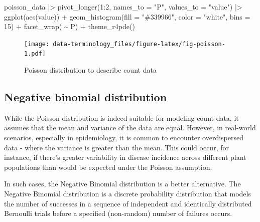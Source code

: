 \documentclass[
  letterpaper,
]{book}
\newenvironment{Shaded}{\begin{snugshade}}{\end{snugshade}}
\newcommand{\AttributeTok}[1]{\textcolor[rgb]{0.40,0.45,0.13}{#1}}
\newcommand{\DecValTok}[1]{\textcolor[rgb]{0.68,0.00,0.00}{#1}}
\newcommand{\FunctionTok}[1]{\textcolor[rgb]{0.28,0.35,0.67}{#1}}
\newcommand{\NormalTok}[1]{\textcolor[rgb]{0.00,0.23,0.31}{#1}}
\newcommand{\SpecialCharTok}[1]{\textcolor[rgb]{0.37,0.37,0.37}{#1}}
\newcommand{\StringTok}[1]{\textcolor[rgb]{0.13,0.47,0.30}{#1}}
\begin{document}
\begin{Shaded}
\begin{Highlighting}[]
\NormalTok{poisson\_data }\SpecialCharTok{|\textgreater{}}
  \FunctionTok{pivot\_longer}\NormalTok{(}\DecValTok{1}\SpecialCharTok{:}\DecValTok{2}\NormalTok{, }\AttributeTok{names\_to =} \StringTok{"P"}\NormalTok{,}
               \AttributeTok{values\_to =} \StringTok{"value"}\NormalTok{) }\SpecialCharTok{|\textgreater{}}
  \FunctionTok{ggplot}\NormalTok{(}\FunctionTok{aes}\NormalTok{(value)) }\SpecialCharTok{+}
  \FunctionTok{geom\_histogram}\NormalTok{(}\AttributeTok{fill =} \StringTok{"\#339966"}\NormalTok{,}
                 \AttributeTok{color =} \StringTok{"white"}\NormalTok{,}
                 \AttributeTok{bins =} \DecValTok{15}\NormalTok{) }\SpecialCharTok{+}
  \FunctionTok{facet\_wrap}\NormalTok{( }\SpecialCharTok{\textasciitilde{}}\NormalTok{ P) }\SpecialCharTok{+}
  \FunctionTok{theme\_r4pde}\NormalTok{()}
\end{Highlighting}
\end{Shaded}

\begin{figure}

{\centering \texttt{[image: data-terminology\_files/figure-latex/fig-poisson-1.pdf]}

}

\caption{\label{fig-poisson}Poisson distribution to describe count data}

\end{figure}

\hypertarget{negative-binomial-distribution}{%
\subsection{Negative binomial
distribution}\label{negative-binomial-distribution}}

While the Poisson distribution is indeed suitable for modeling count
data, it assumes that the mean and variance of the data are equal.
However, in real-world scenarios, especially in epidemiology, it is
common to encounter overdispersed data - where the variance is greater
than the mean. This could occur, for instance, if there's greater
variability in disease incidence across different plant populations than
would be expected under the Poisson assumption.

In such cases, the Negative Binomial distribution is a better
alternative. The Negative Binomial distribution is a discrete
probability distribution that models the number of successes in a
sequence of independent and identically distributed Bernoulli trials
before a specified (non-random) number of failures occurs.
\end{document}
